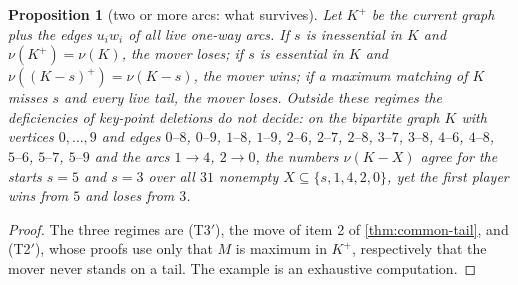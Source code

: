 \documentclass[11pt]{amsart}
\theoremstyle{plain}
\newtheorem{proposition}[theorem]{Proposition}
\theoremstyle{definition}
\theoremstyle{remark}
\numberwithin{equation}{section}
\begin{document}
\begin{proposition}[two or more arcs: what survives]\label{prop:two-arcs}
Let $K^{+}$ be the current graph plus the edges $u_iw_i$ of all live one-way arcs. If $s$ is inessential in $K$ and $\nu(K^{+})=\nu(K)$, the mover loses; if $s$ is essential in $K$ and $\nu((K-s)^{+})=\nu(K-s)$, the mover wins; if a maximum matching of $K$ misses $s$ and every live tail, the mover loses. Outside these regimes the deficiencies of key-point deletions do not decide: on the bipartite graph $K$ with vertices $0,\dots,9$ and edges $0\text{--}8$, $0\text{--}9$, $1\text{--}8$, $1\text{--}9$, $2\text{--}6$, $2\text{--}7$, $2\text{--}8$, $3\text{--}7$, $3\text{--}8$, $4\text{--}6$, $4\text{--}8$, $5\text{--}6$, $5\text{--}7$, $5\text{--}9$ and the arcs $1\to4$, $2\to0$, the numbers $\nu(K-X)$ agree for the starts $s=5$ and $s=3$ over all $31$ nonempty $X\subseteq\{s,1,4,2,0\}$, yet the first player wins from $5$ and loses from $3$.
\end{proposition}
\begin{proof}
The three regimes are (T3$'$), the move of item 2 of \cref{thm:common-tail}, and (T2$'$), whose proofs use only that $M$ is maximum in $K^{+}$, respectively that the mover never stands on a tail. The example is an exhaustive computation.
\end{proof}
\end{document}

